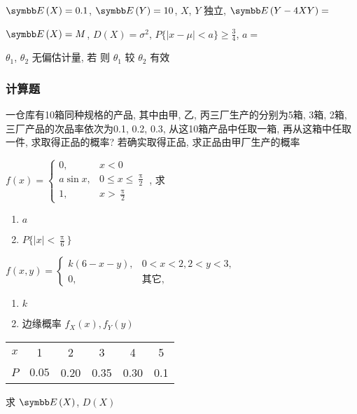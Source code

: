 \begin{ti}
	$\EE(X) = 0.1$, $\EE(Y) = 10$, $X$, $Y$ 独立, $\EE(Y-4XY) = $ \hua
\end{ti}

\begin{ti}
	$\EE(X) = M$, $D(X) = \sigma^2$, $P\bigl\{ |x - \mu| < a \bigr\} \geqslant \frac{3}{4}$, $a = $ \hua
\end{ti}

\begin{ti}
	$\theta_1$, $\theta_2$ 无偏估计量, 若 \hua{} 则 $\theta_1$ 较 $\theta_2$ 有效
\end{ti}

\subsubsection{计算题}
\begin{ti}
	一仓库有10箱同种规格的产品, 其中由甲, 乙, 丙三厂生产的分别为5箱, 3箱, 2箱, 三厂产品的次品率依次为0.1, 0.2, 0.3, 从这10箱产品中任取一箱, 再从这箱中任取一件, 求取得正品的概率? 若确实取得正品, 求正品由甲厂生产的概率
\end{ti}

\begin{ti}
	$f(x) = \begin{cases}
		0,	& x < 0 \\
		a \sin x,	& 0 \leqslant x \leqslant \frac{\uppi}{2}	\\
		1,	&	x > \frac{\uppi}{2}
	\end{cases}$, 求
	\begin{enumerate}
		\item $a$
		\item $P \bigl\{ |x| < \frac{\uppi}{6} \bigr\}$
	\end{enumerate}
\end{ti}

\begin{ti}
	$f(x,y) = \begin{cases}
		k(6-x-y), & 0<x<2, 2<y<3,	\\
		0,	&	\text{其它},
	\end{cases}$
	\begin{enumerate}
		\item $k$
		\item 边缘概率 $f_X(x), f_Y(y)$
	\end{enumerate}
\end{ti}

\begin{ti}
	\mbox{}
	\begin{center}
		\begin{tabular}{cccccc}
			$x$	&	1	&	2	&	3	&	4	&	5	\\
			$P$	&	$0.05$	&	0.20	&	0.35	&	0.30	&	0.1
		\end{tabular}
	\end{center}
	求 $\EE(X)$, $D(X)$
\end{ti}

